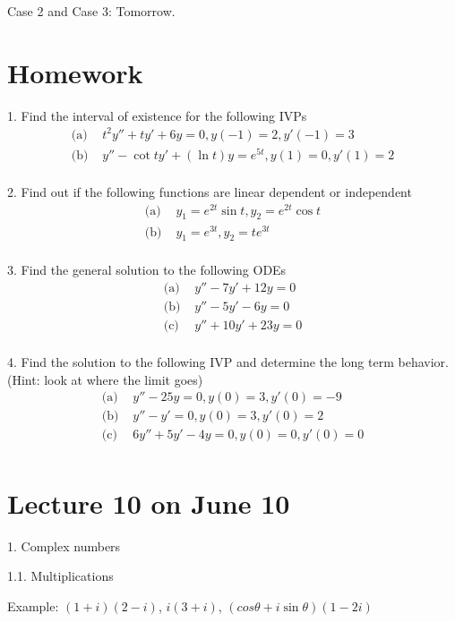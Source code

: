 \documentclass[11pt]{article}
\begin{document}
Case 2 and Case 3: Tomorrow. 

\newpage
\section*{Homework}

1. Find the interval of existence for the following IVPs
$$\begin{aligned}
\text{(a) }& t^2 y'' + ty' + 6y = 0, y(-1) = 2, y'(-1)=3\\
\text{(b) }& y'' - \cot t y' + (\ln t)y = e^{5t}, y(1)=0, y'(1) = 2\\
\end{aligned}$$

2. Find out if the following functions are linear dependent or independent
$$\begin{aligned}
\text{(a) }& y_1 = e^{2t}\sin t, y_2 = e^{2t}\cos t\\
\text{(b) }& y_1 = e^{3t}, y_2= te^{3t}\\
\end{aligned}$$

3. Find the general solution to the following ODEs
$$\begin{aligned}
\text{(a) }& y'' - 7y' + 12y = 0\\
\text{(b) }& y'' - 5y' - 6y = 0\\
\text{(c) }& y'' + 10y' + 23y = 0\\
\end{aligned}$$

4. Find the solution to the following IVP and determine the long term behavior. (Hint: look at where the limit goes)
$$\begin{aligned}
\text{(a) }& y'' - 25y = 0, y(0)=3, y'(0)=-9\\
\text{(b) }& y'' - y' = 0, y(0)=3, y'(0) =2\\
\text{(c) }& 6y'' + 5y' - 4y = 0, y(0)=0, y'(0) = 0\\
\end{aligned}$$

\newpage

\section{Lecture 10 on June 10}

1. Complex numbers

1.1. Multiplications

Example: $(1+i)(2-i)$, $i(3+i)$, $(cos \theta + i \sin \theta)(1-2i)$
\end{document}
